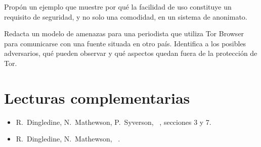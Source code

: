 \begin{esercizio}[2]\label{es:04-usabilita}
Propón un ejemplo que muestre por qué la facilidad de uso constituye un requisito de seguridad, y no solo una comodidad, en un sistema de anonimato.
\end{esercizio}

\begin{esercizio}[2]\label{es:04-modello}
Redacta un modelo de amenazas para una periodista que utiliza Tor Browser para comunicarse con una fuente situada en otro país. Identifica a los posibles adversarios, qué pueden observar y qué aspectos quedan fuera de la protección de Tor.
\end{esercizio}

\section*{Lecturas complementarias}
\begin{itemize}
  \item R.~Dingledine, N.~Mathewson, P.~Syverson, ~\cite{dingledine2004tor}, secciones 3 y 7.
  \item R.~Dingledine, N.~Mathewson, ~\cite{dingledine2006company}.
\end{itemize}

